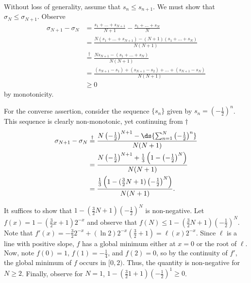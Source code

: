 \documentclass{homework}
\begin{document}
\begin{solution}
  Without loss of generality, assume that $s_n\le s_{n+1}$. We must show that $\sigma_N \le \sigma_{N+1}$.  Observe
  \begin{align*}
    \sigma_{N+1} - \sigma_N 
    &= \frac{s_1 + \dots + s_{N+1}}{N+1} - \frac{s_1 + \dots + s_N}{N} \\
    &= \frac{N(s_1+\dots + s_{N+1}) - (N+1)(s_1+\dots + s_N)}{N(N+1)}\\
    &\stackrel{\dagger}= \frac{Ns_{N+1} - (s_1+\dots + s_N)}{N(N+1)}\\
    &= \frac{(s_{N+1} - s_1) + (s_{N+1} - s_2) + \dots + (s_{N+1} - s_N)}{N(N+1)}\\
    &\ge 0 
  \end{align*}
  by monotonicity.

  For the converse assertion, consider the sequence $\{s_n\}$ given by $s_n = \left(-\frac{1}{2}\right)^n$. This sequence is clearly non-monotonic, yet continuing from $\dagger$
  \begin{align*}
    \sigma_{N+1} - \sigma_{N} &\stackrel{\dagger}= \frac{N\left(-\frac 12\right)^{N+1} - \ds{\sum_{n=1}^N \left(-\frac 12\right)^n}}{N(N+1)}\\
    &= \frac{N\left(-\frac 12\right)^{N+1} + \frac 13\left(1-\left(-\frac 12\right)^N\right)}{N(N+1)}\\
    &= \frac{\frac 13\left(1-(\frac32 N+1)\left(-\frac 12\right)^N\right)}{N(N+1)}.\\
  \end{align*}

  It suffices to show that $1-(\frac32 N+1)\left(-\frac 12\right)^N$ is
  non-negative. Let $f(x) = 1 - (\frac 32 x + 1)2^{-x}$ and observe that $f(N) \le 1-(\frac 32 N +1)\left(-\frac 12 \right)^N$. Note that $f'(x) =
  -\frac 32 2^{-x} + (\ln 2) 2^{-x}(\frac 32 +1) = \ell(x) 2^{-x}$.  Since
  $\ell$ is a line with positive slope, $f$ has a global minimum either at
  $x=0$ or the root of $\ell$. Now, note $f(0) = 1$, $f(1) = -\frac 14$, and
  $f(2) = 0$, so by the continuity of $f'$, the global minimum of $f$ occurs in
  $[0,2)$.  Thus, the quantity is non-negative for $N \ge 2$. Finally, observe for $N=1$,
  $1 - (\frac 32 1 + 1)\left(-\frac 12\right)^1 \ge 0$.
\end{solution}
\end{document}
